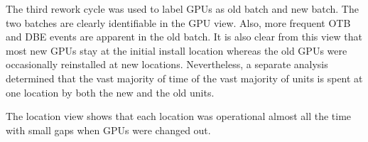 The third rework cycle was used to label GPUs as old batch and new
batch. The two batches are clearly identifiable in the GPU view. Also,
more frequent OTB and DBE events are apparent in the old batch. It is
also clear from this view that most new GPUs stay at the initial
install location whereas the old GPUs were occasionally reinstalled at
new locations. Nevertheless, a separate analysis determined that the
vast majority of time of the vast majority of units is spent at one
location by both the new and the old units.

The location view shows that each location was operational almost all
the time with small gaps when GPUs were changed out.

